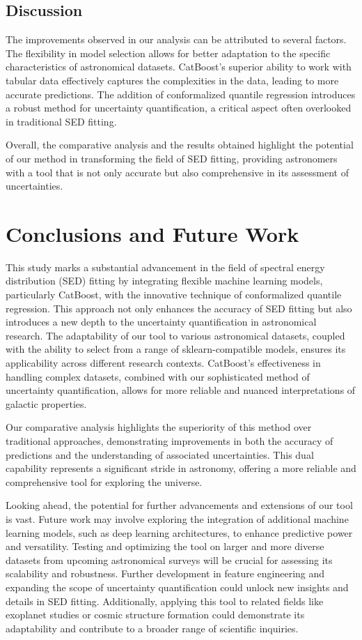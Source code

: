 \documentclass[letterpaper]{article} %
\begin{document}
\subsection{Discussion}
The improvements observed in our analysis can be attributed to several factors. The flexibility in model selection allows for better adaptation to the specific characteristics of astronomical datasets. CatBoost's superior ability to work with tabular data effectively captures the complexities in the data, leading to more accurate predictions. The addition of conformalized quantile regression introduces a robust method for uncertainty quantification, a critical aspect often overlooked in traditional SED fitting.

Overall, the comparative analysis and the results obtained highlight the potential of our method in transforming the field of SED fitting, providing astronomers with a tool that is not only accurate but also comprehensive in its assessment of uncertainties.

\section{Conclusions and Future Work}

This study marks a substantial advancement in the field of spectral energy distribution (SED) fitting by integrating flexible machine learning models, particularly CatBoost, with the innovative technique of conformalized quantile regression. This approach not only enhances the accuracy of SED fitting but also introduces a new depth to the uncertainty quantification in astronomical research. The adaptability of our tool to various astronomical datasets, coupled with the ability to select from a range of sklearn-compatible models, ensures its applicability across different research contexts. CatBoost's effectiveness in handling complex datasets, combined with our sophisticated method of uncertainty quantification, allows for more reliable and nuanced interpretations of galactic properties.

Our comparative analysis highlights the superiority of this method over traditional approaches, demonstrating improvements in both the accuracy of predictions and the understanding of associated uncertainties. This dual capability represents a significant stride in astronomy, offering a more reliable and comprehensive tool for exploring the universe.

Looking ahead, the potential for further advancements and extensions of our tool is vast. Future work may involve exploring the integration of additional machine learning models, such as deep learning architectures, to enhance predictive power and versatility. Testing and optimizing the tool on larger and more diverse datasets from upcoming astronomical surveys will be crucial for assessing its scalability and robustness. Further development in feature engineering and expanding the scope of uncertainty quantification could unlock new insights and details in SED fitting. Additionally, applying this tool to related fields like exoplanet studies or cosmic structure formation could demonstrate its adaptability and contribute to a broader range of scientific inquiries.
\end{document}
